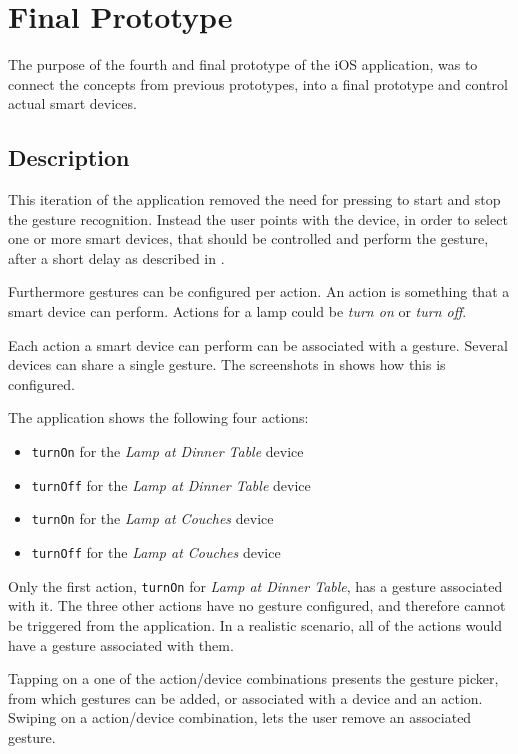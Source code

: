 \section{Final Prototype}
\label{sec:implementation:prototypes:prototype4}
The purpose of the fourth and final prototype of the iOS application, 
was to connect the concepts from previous prototypes, 
into a final prototype and control actual smart devices.

\subsection{Description}
This iteration of the application removed the need for pressing to start and stop the gesture recognition. 
Instead the user points with the device, 
in order to select one or more smart devices, 
that should be controlled and perform the gesture, 
after a short delay as described in .

Furthermore gestures can be configured per action.
An action is something that a smart device can perform. 
Actions for a lamp could be \textit{turn on} or \textit{turn off}.

Each action a smart device can perform can be associated with a gesture. 
Several devices can share a single gesture. 
The screenshots in  shows how this is configured.

The application shows the following four actions:
\begin{itemize}
\item \texttt{turnOn} for the \emph{Lamp at Dinner Table} device
\item \texttt{turnOff} for the \emph{Lamp at Dinner Table} device
\item \texttt{turnOn} for the \emph{Lamp at Couches} device
\item \texttt{turnOff} for the \emph{Lamp at Couches} device
\end{itemize}

Only the first action, 
\texttt{turnOn} for \emph{Lamp at Dinner Table}, 
has a gesture associated with it. 
The three other actions have no gesture configured, 
and therefore cannot be triggered from the application.
In a realistic scenario, all of the actions would have a gesture associated with them.

Tapping on a one of the action/device combinations presents the gesture picker, 
from which gestures can be added, 
or associated with a device and an action. 
Swiping on a action/device combination, 
lets the user remove an associated gesture.

